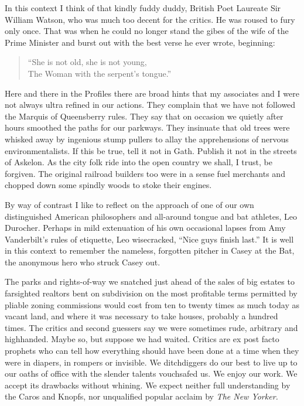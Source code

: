 \documentclass[11pt,letterpaper]{article}
\begin{document}
In this context I think of that kindly fuddy duddy, British Poet Laureate Sir William Watson, who was much too decent for the critics. He was roused to fury only once. That was when he could no longer stand the gibes of the wife of the Prime Minister and burst out with the best verse he ever wrote, beginning:

\begin{quote}
\enquote{She is not old, she is not young,\\
The Woman with the serpent's tongue.}
\end{quote}

Here and there in the Profiles there are broad hints that my associates and I were not always ultra refined in our actions. They complain that we have not followed the Marquis of Queensberry rules. They say that on occasion we quietly after hours smoothed the paths for our parkways. They insinuate that old trees were whisked away by ingenious stump pullers to allay the apprehensions of nervous environmentalists. If this be true, tell it not in Gath. Publish it not in the streets of Askelon. As the city folk ride into the open country we shall, I trust, be forgiven. The original railroad builders too were in a sense fuel merchants and chopped down some spindly woods to stoke their engines.

By way of contrast I like to reflect on the approach of one of our own distinguished American philosophers and all-around tongue and bat athletes, Leo Durocher. Perhaps in mild extenuation of his own occasional lapses from Amy Vanderbilt's rules of etiquette, Leo wisecracked, \enquote{Nice guys finish last.} It is well in this context to remember the nameless, forgotten pitcher in Casey at the Bat, the anonymous hero who struck Casey out.

The parks and rights-of-way we snatched just ahead of the sales of big estates to farsighted realtors bent on subdivision on the most profitable terms permitted by pliable zoning commissions would cost from ten to twenty times as much today as vacant land, and where it was necessary to take houses, probably a hundred times. The critics and second guessers say we were sometimes rude, arbitrary and highhanded. Maybe so, but suppose we had waited. Critics are ex post facto prophets who can tell how everything should have been done at a time when they were in diapers, in rompers or invisible. We ditchdiggers do our best to live up to our oaths of office with the slender talents vouchsafed us. We enjoy our work. We accept its drawbacks without whining. We expect neither full understanding by the Caros and Knopfs, nor unqualified popular acclaim by \textit{The New Yorker.}
\end{document}
